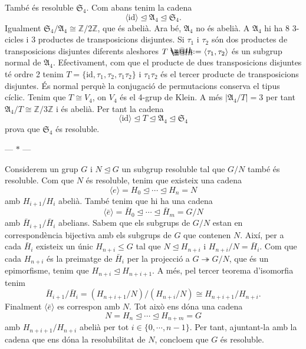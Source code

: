\documentclass[12pt]{article}
\makeatletter
\renewcommand{\S}{\mathfrak{S}}
\newcommand{\A}{\mathfrak{A}}
\newcommand{\Z}{\mathbb{Z}}
\newcommand{\gen}[1]{\langle #1 \rangle}
\newcommand{\abs}[1]{\left\lvert #1 \right\rvert}
\newcommand{\normal}{\trianglelefteq}
\newcommand{\id}{\mathrm{id}}
\newcommand{\parbreak}{
	\begin{center}
		--- $\ast$ ---
	\end{center} 
}
\newcommand*{\defeq}{\mathrel{\rlap{%
    \raisebox{0.3ex}{$\m@th\cdot$}}%
  \raisebox{-0.3ex}{$\m@th\cdot$}}%
=}
\makeatother
\begin{document}
També és resoluble \( \S_4 \). Com abans tenim la cadena 
\begin{equation*}
	\gen{\id} \normal \A_4 \normal \S_4.
\end{equation*}
Igualment \( \S_4 / \A_4 \cong \Z / 2\Z \), que és abelià. Ara bé, \( \A_4 \) no és abelià. A \( \A_4 \) hi ha 8 3-cicles i 3 productes de transposicions disjuntes. Si \( \tau_1 \) i \( \tau_2 \) són dos productes de transposicions disjuntes diferents aleshores \( T \defeq \gen{\tau_1, \tau_2} \) és un subgrup normal de \( \A_4 \). Efectivament, com que el producte de dues transposicions disjuntes té ordre 2 tenim \( T = \{ \id, \tau_1, \tau_2, \tau_1 \tau_2 \} \) i \( \tau_1\tau_2 \) és el tercer producte de transposicions disjuntes. És normal perquè la conjugació de permutacions conserva el tipus cíclic. Tenim que \( T \cong V_4 \), on \( V_4 \) és el 4-grup de Klein. A més \( \abs{\A_4 / T} = 3 \) per tant \( \A_4 / T \cong \Z/3\Z \) i és abelià. Per tant la cadena
\begin{equation*}
	\gen{\id} \normal T \normal \A_4 \normal \S_4
\end{equation*}
prova que \( \S_4 \) és resoluble. 

\parbreak

Considerem un grup \( G \) i \( N \normal G \) un subgrup resoluble tal que \( G/N \) també és resoluble. Com que \( N \) és resoluble, tenim que existeix una cadena 
\begin{equation*}
	\gen{e} = H_0 \normal \cdots \normal H_n = N
\end{equation*}
amb \( H_{i+1} / H_i \) abelià. També tenim que hi ha una cadena 
\begin{equation*}
	\gen{\bar{e}} = \bar{H}_0 \normal \cdots \normal \bar{H}_m = G/N
\end{equation*}
amb \( \bar{H}_{i+1} / \bar{H}_i \) abelians. Sabem que els subgrups de \( G/N \) estan en correspondència bijectiva amb els subgrups de \( G \) que contenen \( N \). Així, per a cada \( \bar{H}_i \) existeix un únic \( H_{n+i} \leq G \) tal que \( N \normal H_{n+i} \) i \( H_{n+i}/N = \bar{H}_i \). Com que cada \( H_{n+i} \) és la preimatge de \( \bar{H}_i \) per la projecció a \( G \twoheadrightarrow G/N \), que és un epimorfisme, tenim que \( H_{n+i} \normal H_{n+i+1} \). A més, pel tercer teorema d'isomorfia tenim
\begin{equation*}
	\bar{H}_{i+1}/\bar{H}_i = (H_{n+i+1}/N)/(H_{n+i}/N) \cong H_{n+i+1}/H_{n+i}.
\end{equation*}
Finalment \( \gen{\bar{e}} \) es correspon amb \( N \). Tot això ens dóna una cadena
\begin{equation*}
	N = H_{n} \normal \cdots \normal H_{n+m} = G
\end{equation*}
amb \( H_{n+i+1}/H_{n+i} \)	abelià per tot \( i \in \{0, \cdots , n-1\} \). Per tant, ajuntant-la amb la cadena que ens dóna la resolubilitat de \( N \), concloem que \( G \) és resoluble. 
\end{document}
